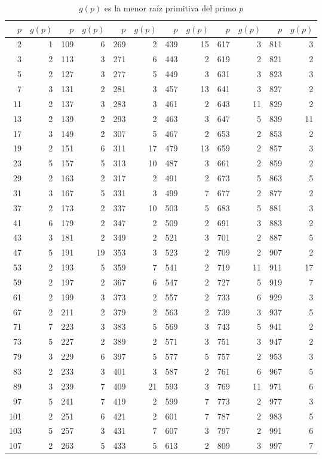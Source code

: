 \documentclass[12pt,a4paper]{book}
\begin{document}
    \begin{table}[H]
        \centering
        \small
        \caption{$g(p)$ es la menor raíz primitiva del primo $p$}
        \begin{tabular}{rr|rr|rr|rr|rr|rr}
            $p$&$g(p)$&$p$&$g(p)$&$p$&$g(p)$&$p$&$g(p)$&$p$&$g(p)$&$p$&$g(p)$\\\hline
            2&1&109&6&269&2&439&15&617&3&811&3\\
            3&2&113&3&271&6&443&2&619&2&821&2\\
            5&2&127&3&277&5&449&3&631&3&823&3\\
            7&3&131&2&281&3&457&13&641&3&827&2\\
            11&2&137&3&283&3&461&2&643&11&829&2\\[4pt]
            13&2&139&2&293&2&463&3&647&5&839&11\\
            17&3&149&2&307&5&467&2&653&2&853&2\\
            19&2&151&6&311&17&479&13&659&2&857&3\\
            23&5&157&5&313&10&487&3&661&2&859&2\\
            29&2&163&2&317&2&491&2&673&5&863&5\\[4pt]
            31&3&167&5&331&3&499&7&677&2&877&2\\
            37&2&173&2&337&10&503&5&683&5&881&3\\
            41&6&179&2&347&2&509&2&691&3&883&2\\
            43&3&181&2&349&2&521&3&701&2&887&5\\
            47&5&191&19&353&3&523&2&709&2&907&2\\[4pt]
            53&2&193&5&359&7&541&2&719&11&911&17\\
            59&2&197&2&367&6&547&2&727&5&919&7\\
            61&2&199&3&373&2&557&2&733&6&929&3\\
            67&2&211&2&379&2&563&2&739&3&937&5\\
            71&7&223&3&383&5&569&3&743&5&941&2\\[4pt]
            73&5&227&2&389&2&571&3&751&3&947&2\\
            79&3&229&6&397&5&577&5&757&2&953&3\\
            83&2&233&3&401&3&587&2&761&6&967&5\\
            89&3&239&7&409&21&593&3&769&11&971&6\\
            97&5&241&7&419&2&599&7&773&2&977&3\\[4pt]
            101&2&251&6&421&2&601&7&787&2&983&5\\
            103&5&257&3&431&7&607&3&797&2&991&6\\
            107&2&263&5&433&5&613&2&809&3&997&7\\
        \end{tabular}
    \end{table}
\end{document}
